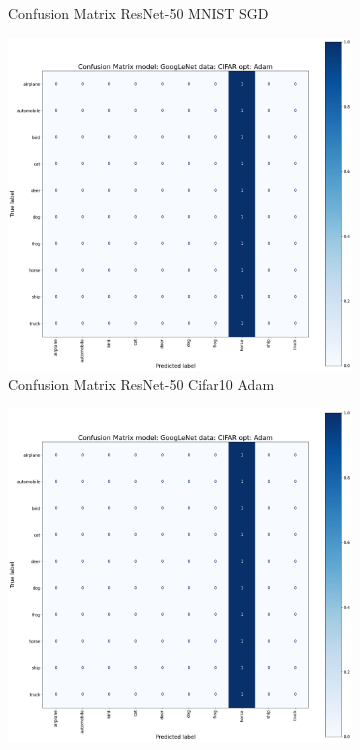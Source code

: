 \documentclass[conference]{IEEEtran}
\begin{document}
\begin{figure}[!htbp]
\begin{subfigure}[b]{0.22\textwidth}
        \caption{Confusion Matrix ResNet-50 MNIST SGD}
        \label{fig:x matrix_ResNet_MNIST_SGD}
    \end{subfigure}
    \begin{subfigure}[b]{0.22\textwidth}
        \centering
        \includegraphics[width=\textwidth]{img/matrix_sample.png}
        \caption{Confusion Matrix ResNet-50 Cifar10 Adam}
        \label{fig:x matrix_ResNet_CIFAR_Adam}
    \end{subfigure}
    \hfill
    \begin{subfigure}[b]{0.22\textwidth}
        \centering
        \includegraphics[width=\textwidth]{img/matrix_sample.png}

\end{subfigure}
\end{figure}
\end{document}
